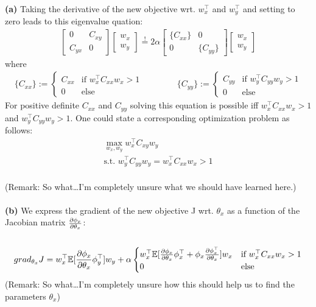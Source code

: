 \documentclass[a4paper]{article}
\newcommand{\eqq}{  \overset{\text{!}}{=} }
\newcommand{\wx}{{w_{x}}}
\newcommand{\wy}{{w_{y}}}
\newcommand{\wxt}{w_{x}^\top}
\newcommand{\wyt}{w_{y}^\top}
\newcommand{\Cxx}{C_{xx}}
\newcommand{\Cxy}{C_{xy}}
\newcommand{\Cyx}{C_{yx}}
\newcommand{\Cyy}{C_{yy}}
\newcommand{\1}{\mathds{1}}
\begin{document}
\textbf{(a)} Taking the derivative of the new objective wrt. $\wxt$ and $\wyt$ and setting to 
zero leads to this eigenvalue quation: 
\begin{align*}
	\begin{bmatrix}
	0 & \Cxy \\
	\Cyx & 0 
	\end{bmatrix}
	\begin{bmatrix}
	 \wx  \\
	 \wy
	\end{bmatrix}
\eqq	 
	2\alpha		
	\begin{bmatrix}
	\{\Cxx\} & 0 \\
	0 & \{\Cyy\}   
	\end{bmatrix}
	\begin{bmatrix}
	 \wx  \\
	 \wy
	\end{bmatrix}	
\end{align*}
where
\begin{align*} 
	\{\Cxx\} := \begin{cases} \Cxx &\text{if } \wxt\Cxx\wx > 1\\ 0 &\text{else} \end{cases}
	\quad\quad\quad\quad
	\{\Cyy\} := \begin{cases} \Cyy &\text{if } \wyt\Cyy\wy > 1\\ 0 &\text{else} \end{cases}
\end{align*}
For positive definite $\Cxx$ and $\Cyy$ solving this equation is possible
iff $\wxt\Cxx\wx > 1$ and $\wyt\Cyy\wy > 1$. 
One could state a corresponding optimization problem as follows: 
\begin{gather*}
	\max_{\wx,\wy} \wxt\Cxy\wy \\ 
	\text{s.t. } \wyt\Cyy\wy = \wxt C_{xx} \wx > 1 
\end{gather*}
\\
(Remark: So what\ldots I'm completely unsure what we should have learned here.)
\\
\\
\textbf{(b)}
We express the gradient of the new objective J wrt. $\theta_x$
as a function of the Jacobian matrix ${\partial\phi_x\over\partial\theta_x}$:\\
\\
\begin{gather*}
grad_{\theta_x}J 
= 
\wxt\mathbb{E}[{ {\partial\phi_x\over\partial\theta_x} \phi^\top_y }]\wy
+ \alpha 
	\begin{cases} \wxt
	\mathbb{E}[{ {\partial\phi_x\over\partial\theta_x} \phi^\top_x} + { \phi_x {\partial\phi_x^\top\over\partial\theta_x} } ]
	\wx &\text{if } \wxt\Cxx\wx > 1\\ 0 &\text{else} \end{cases}
\end{gather*}
(Remark: So what\ldots I'm completely unsure how this should help us to find the parameters $\theta_x$)
\end{document}
